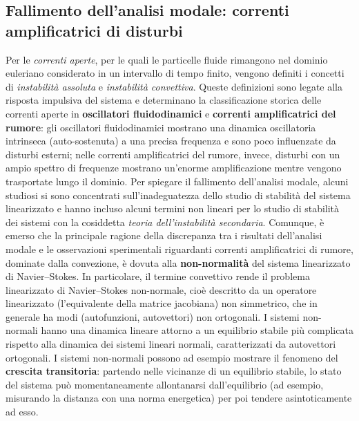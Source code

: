 \subsection{Fallimento dell'analisi modale: correnti amplificatrici di disturbi}
Per le \textit{correnti aperte}, per le quali le particelle fluide rimangono nel dominio euleriano considerato in un intervallo di tempo finito, vengono definiti i concetti di \textit{instabilità assoluta} e \textit{instabilità convettiva}. Queste definizioni sono legate alla risposta impulsiva del sistema e determinano la classificazione storica delle correnti aperte in \textbf{oscillatori fluidodinamici} e \textbf{correnti amplificatrici del rumore}: gli oscillatori fluidodinamici mostrano una dinamica oscillatoria intrinseca (auto-sostenuta) a una precisa frequenza e sono poco influenzate da disturbi esterni; nelle correnti amplificatrici del rumore, invece, disturbi con un ampio spettro di frequenze mostrano un'enorme amplificazione mentre vengono trasportate lungo il dominio.
%
\newline
Per spiegare il fallimento dell'analisi modale, alcuni studiosi si sono concentrati sull'inadeguatezza dello studio di stabilità del sistema linearizzato e hanno incluso alcuni termini non lineari per lo studio di stabilità dei sistemi con la cosiddetta \textit{teoria dell'instabilità secondaria}. Comunque, è emerso che la principale ragione della discrepanza tra i risultati dell'analisi modale e le osservazioni sperimentali riguardanti correnti amplificatrici di rumore, dominate dalla convezione, è dovuta alla \textbf{non-normalità} del sistema linearizzato di Navier--Stokes. In particolare, il termine convettivo rende il problema linearizzato di Navier--Stokes non-normale, cioè descritto da un operatore linearizzato (l'equivalente della matrice jacobiana) non simmetrico, che in generale ha modi (autofunzioni, autovettori) non ortogonali. I sistemi non-normali hanno una dinamica lineare attorno a un equilibrio stabile più complicata rispetto alla dinamica dei sistemi lineari normali, caratterizzati da autovettori ortogonali.
%
\newline
I sistemi non-normali possono ad esempio mostrare il fenomeno del \textbf{crescita transitoria}: partendo nelle vicinanze di un equilibrio stabile, lo stato del sistema può momentaneamente allontanarsi dall'equilibrio (ad esempio, misurando la distanza con una norma energetica) per poi tendere asintoticamente ad esso.
